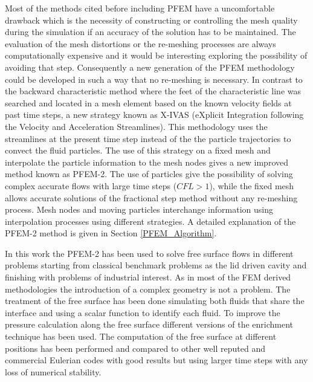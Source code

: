 Most of the methods cited before including PFEM have a uncomfortable drawback which is the necessity of constructing or controlling the mesh quality during the simulation if an accuracy of the solution has to be maintained. The evaluation of the mesh distortions or the re-meshing processes are always computationally expensive and it would be interesting exploring the possibility of avoiding that step. Consequently a new generation of the PFEM methodology could be developed in such a way that no re-meshing is necessary.
In contrast to the backward characteristic method where the feet of the characteristic line was searched and located in a mesh element based on the known velocity fields at past time steps, a new strategy known as X-IVAS (eXplicit Integration following the Velocity and Acceleration Streamlines)\cite{Idelsohn12}. This methodology uses the streamlines at the present time step instead of the the particle trajectories to convect the fluid particles. The use of this strategy on a fixed mesh and interpolate the particle information to the mesh nodes gives a new improved method known as PFEM-2\cite{Idelsohn12b}. The use of particles give the possibility of solving complex accurate flows with large time steps ($CFL>1$), while the fixed mesh allows accurate solutions of the fractional step method without any re-meshing process. Mesh nodes and moving particles interchange information using interpolation processes using different strategies. A detailed explanation of the PFEM-2 method is given in Section \ref{PFEM_Algorithm}.

In this work the PFEM-2 has been used to solve free surface flows in different problems starting from classical benchmark problems as the lid driven cavity and finishing with problems of industrial interest. As in most of the FEM derived methodologies the introduction of a complex geometry is not a problem. The treatment of the free surface has been done simulating both fluids that share the interface and using a scalar function to identify each fluid. To improve the pressure calculation along the free surface different versions of the enrichment technique \cite{Coppola05} has been used. The computation of the free surface at different positions has been performed and compared to other well reputed and commercial Eulerian codes with good results but using larger time steps with any loss of numerical stability. 